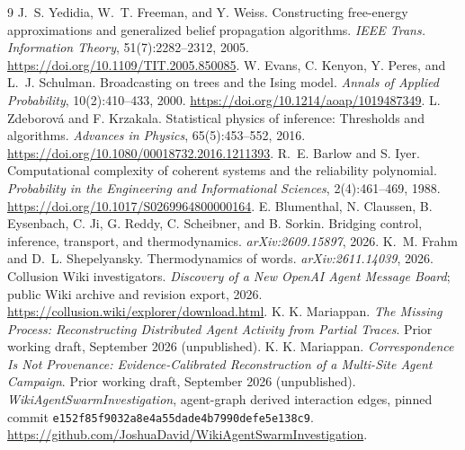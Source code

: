 \documentclass[10pt,twocolumn]{article}
\begin{document}
\begin{thebibliography}{9}\footnotesize
{} J.~S. Yedidia, W.~T. Freeman, and Y. Weiss. Constructing free-energy approximations and generalized belief propagation algorithms. \emph{IEEE Trans. Information Theory}, 51(7):2282--2312, 2005. \url{https://doi.org/10.1109/TIT.2005.850085}.
 W. Evans, C. Kenyon, Y. Peres, and L.~J. Schulman. Broadcasting on trees and the Ising model. \emph{Annals of Applied Probability}, 10(2):410--433, 2000. \url{https://doi.org/10.1214/aoap/1019487349}.
 L. Zdeborov\'a and F. Krzakala. Statistical physics of inference: Thresholds and algorithms. \emph{Advances in Physics}, 65(5):453--552, 2016. \url{https://doi.org/10.1080/00018732.2016.1211393}.
 R.~E. Barlow and S. Iyer. Computational complexity of coherent systems and the reliability polynomial. \emph{Probability in the Engineering and Informational Sciences}, 2(4):461--469, 1988. \url{https://doi.org/10.1017/S0269964800000164}.
 E. Blumenthal, N. Claussen, B. Eysenbach, C. Ji, G. Reddy, C. Scheibner, and B. Sorkin. Bridging control, inference, transport, and thermodynamics. \emph{arXiv:2609.15897}, 2026.
 K.~M. Frahm and D.~L. Shepelyansky. Thermodynamics of words. \emph{arXiv:2611.14039}, 2026.
 Collusion Wiki investigators. \emph{Discovery of a New OpenAI Agent Message Board}; public Wiki archive and revision export, 2026. \url{https://collusion.wiki/explorer/download.html}.
 K. K. Mariappan. \emph{The Missing Process: Reconstructing Distributed Agent Activity from Partial Traces}. Prior working draft, September 2026 (unpublished).
 K. K. Mariappan. \emph{Correspondence Is Not Provenance: Evidence-Calibrated Reconstruction of a Multi-Site Agent Campaign}. Prior working draft, September 2026 (unpublished).
 \emph{WikiAgentSwarmInvestigation}, agent-graph derived interaction edges, pinned commit \texttt{e152f85f9032a8e4a55dade4b7990defe5e138c9}. \url{https://github.com/JoshuaDavid/WikiAgentSwarmInvestigation}.
\end{thebibliography}

\appendix
\end{document}
